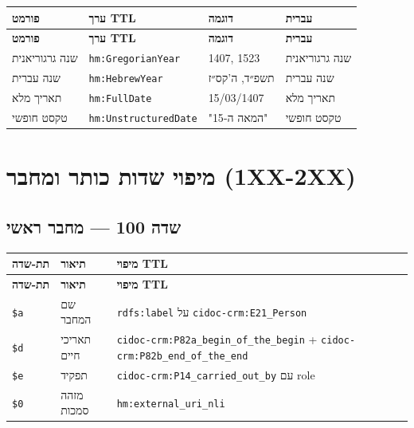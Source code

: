 \documentclass[12pt,a4paper]{article}
\newcommand{\marcfield}[1]{\texttt{#1}}
\newcommand{\ttlprop}[1]{\texttt{#1}}
\newcommand{\ttlclass}[1]{\texttt{#1}}
\begin{document}
\begin{longtable}{|p{3cm}|L{4.5cm}|L{4.5cm}|p{4cm}|}
\hline
\textbf{פורמט} & \textbf{ערך TTL} & \textbf{דוגמה} & \textbf{עברית} \\
\hline
\endfirsthead
\hline
\textbf{פורמט} & \textbf{ערך TTL} & \textbf{דוגמה} & \textbf{עברית} \\
\hline
\endhead
\hline
\endfoot
שנה גרגוריאנית & \ttlclass{hm:GregorianYear} & 1407, 1523 & שנה גרגוריאנית \\
\hline
שנה עברית & \ttlclass{hm:HebrewYear} & תשפ״ד, ה'קס״ז & שנה עברית \\
\hline
תאריך מלא & \ttlclass{hm:FullDate} & 15/03/1407 & תאריך מלא \\
\hline
טקסט חופשי & \ttlclass{hm:UnstructuredDate} & "המאה ה-15" & טקסט חופשי \\
\hline
\end{longtable}

\newpage
\section{מיפוי שדות כותר ומחבר \textenglish{(1XX-2XX)}}

\subsection{שדה 100 — מחבר ראשי}

\begin{longtable}{|L{2.5cm}|p{4.5cm}|L{9cm}|}
\hline
\textbf{תת-שדה} & \textbf{תיאור} & \textbf{מיפוי TTL} \\
\hline
\endfirsthead
\hline
\textbf{תת-שדה} & \textbf{תיאור} & \textbf{מיפוי TTL} \\
\hline
\endhead
\hline
\endfoot
\marcfield{\$a} & שם המחבר & \ttlprop{rdfs:label} על \ttlclass{cidoc-crm:E21\_Person} \\
\hline
\marcfield{\$d} & תאריכי חיים & \ttlprop{cidoc-crm:P82a\_begin\_of\_the\_begin} + \ttlprop{cidoc-crm:P82b\_end\_of\_the\_end} \\
\hline
\marcfield{\$e} & תפקיד & \ttlprop{cidoc-crm:P14\_carried\_out\_by} עם role \\
\hline
\marcfield{\$0} & מזהה סמכות & \ttlprop{hm:external\_uri\_nli} \\
\hline
\end{longtable}
\end{document}
